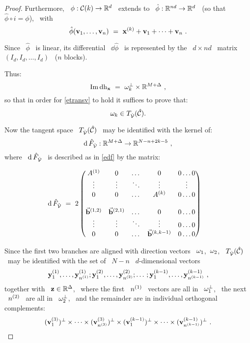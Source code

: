 \begin{proof}
Furthermore, \ $\phi:\mathcal{C}(k)\to{\mathbb R}^{d}$ \ extends to \
$\hat{\phi}:{\mathbb R}^{nd}\to{\mathbb R}^{d}$ \ (so that \ $\hat{\phi}\circ i=\phi$), \
with
$$
\hat{\phi}(\mathbf{v}_{1},\dotsc,\mathbf{v}_{n})~=~\mathbf{x}\sp{({k})}+\mathbf{v}_{1}+\dotsb+\mathbf{v}_{n}~.
$$

Since \ $\hat{\phi}$ \ is linear, its differential \ $\dd\hat{\phi}$ \
is represented by the \ $d\times nd$ \ matrix \
$(I_{d},I_{d},\dotsc,I_{d})$ \ ($n$ blocks).

Thus:
%
$$
\operatorname{Im}\operatorname{dh}_{\mathbf{x}}~=~\mathbf{\omega}_{k}^{\perp}\times{\mathbb R}^{M+\Delta}~,
$$
%
\noindent so that in order for \eqref{etransv} to hold it suffices to
prove that:
%
\begin{equation}\label{eomega}
%
\oj{k}\in T_{\hV}(\hC) \vsm.
%
\end{equation}

Now the tangent space \ $T_{\hat{\mathcal{V}}}(\hat{\mathcal{C}})$ \ may be identified with the
kernel of:
$$
\operatorname{d}\hat{F}_{\hat{\mathcal{V}}}:{\mathbb R}^{M+\Delta}\to{\mathbb R}^{N-n+2k-5}~,
$$
%
where \ $\operatorname{d}\hat{F}_{\hat{\mathcal{V}}}$ \ is described as in \eqref{edf} by the matrix:

\begin{equation}\label{edfn}
%
\dd\hF_{\hV}~=~
2\begin{pmatrix}
%
A\up{1}   & 0         &  \dotsc  &      0      & 0 \dotsc 0 \\
 \vdots   & \vdots    &  \ddots  &    \vdots   & \vdots     \\
 0        & 0         &  \dotsc  & A\up{k}     & 0 \dotsc 0 \\
          &           &          &             &            \\
\bj{1}{2} & \bj{2}{1} &  \dotsc  &       0     & 0 \dotsc 0 \\
\vdots    & \vdots    &  \ddots  &  \vdots     & 0 \dotsc 0 \\
 0        & 0         & \dotsc   & \bj{k}{k-1} & 0 \dotsc 0
\end{pmatrix}\vspace{4mm}\quad
%
\end{equation}

Since the first two branches are aligned with
direction vectors \ $\mathbf{\omega}_{1}$,\ $\mathbf{\omega}_{2}$, \ $T_{\hat{\mathcal{V}}}(\hat{\mathcal{C}})$ \
may be identified with the set of \ $N-n$ \ $d$-dimensional vectors \
$$
\mathbf{y}\sp{({1})}_{1},\dotsc,\mathbf{y}\sp{({1})}_{n\sp{({1})}};
\mathbf{y}\sp{({2})}_{1},\dotsc,\mathbf{y}\sp{({2})}_{n\sp{({2})}};\dotsc;
\mathbf{y}\sp{({k-1})}_{1},\dotsc,\mathbf{y}\sp{({k-1})}_{n\sp{({k-1})}}~,
$$
%
together with \ $\mathbf{z}\in{\mathbb R}^{\Delta}$, \ where the first \ $n\sp{({1})}$ \
vectors are all in \ $\mathbf{\omega}_{1}^{\perp}$, \ the next \ $n\sp{({2})}$ \ are all
in \ $\mathbf{\omega}_{2}^{\perp}$, \ and the remainder are in individual orthogonal
complements:
$$
(\mathbf{v}\sp{({3})}_{1})^{\perp}\times\dotsb\times(\mathbf{v}\sp{({3})}_{n\sp{({3})}})^{\perp}\times
(\mathbf{v}\sp{({k-1})}_{1})^{\perp}\times\dotsb\times(\mathbf{v}\sp{({k-1})}_{n\sp{({k-1})}})^{\perp}~.
$$


\end{proof}
